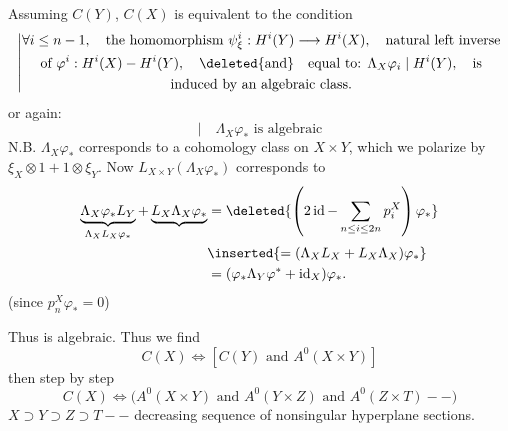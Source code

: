 Assuming $C(Y)$, $C(X)$ is equivalent to the condition
\[
\left|\begin{gathered}
\forall i\leq n-1,\quad\text{the homomorphism }\psi_\xi^i:H^i(Y)\longrightarrow H^i(X),\quad\text{natural left inverse}\\
\text{of }\varphi^i:H^i(X)\mathbin{-}H^i(Y),\quad\deleted{\text{and}}\quad\text{equal to: }\Lambda_X\varphi_{i}\mid H^i(Y),\quad\text{is}\\
\text{induced by an algebraic class.}
\end{gathered}\right.
\]
or again:
\[
\left|\quad\Lambda_X\varphi_*\text{ is algebraic}\right.
\]
\quad N.B. $\Lambda_X\varphi_*$ corresponds to a cohomology class
on $X\times Y$, which we polarize by $\xi_X\otimes1+1\otimes\xi_Y$.
Now  $L_{X\times Y}(\Lambda_X\varphi_*)$ corresponds to
\[
\begin{aligned}
\underbrace{\Lambda_X\varphi_*L_Y}_{\Lambda_XL_X\varphi_*}
 +\underbrace{L_X\Lambda_X\varphi_*}
 &=\deleted{\left(2\operatorname{id}-\sum_{n\leq i\leq2n}p_i^X\right)\varphi_*}\\
 &\inserted{=(\Lambda_XL_X+L_X\Lambda_X)\varphi_*}\\
 &=(\varphi_*\Lambda_Y\varphi^*+\operatorname{id}_X)\varphi_*.
\end{aligned}
\]
(since $p_n^X\varphi_*=0$)

Thus is algebraic. Thus we find
\[
C(X)\Longleftrightarrow[C(Y)\text{ and }A^0(X\times Y)]
\]
then step by step
\[
C(X)\Longleftrightarrow\bigl(A^0(X\times Y)\text{ and }A^0(Y\times Z)\text{ and }A^0(Z\times T)\mathbin{-}\mathbin{-}\bigr)
\]
\quad
$X\supset Y\supset Z\supset T\mathbin{-}\mathbin{-}$  decreasing sequence of nonsingular hyperplane sections.

